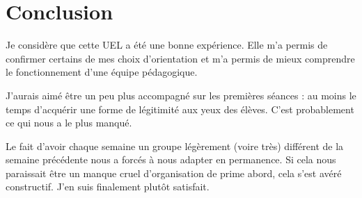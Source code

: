 \section{Conclusion}

Je considère que cette UEL a été une bonne expérience. Elle  m'a permis de confirmer certains de mes choix d'orientation
et m'a permis de mieux comprendre le fonctionnement d'une équipe pédagogique.

J'aurais aimé être un peu plus accompagné sur les premières séances : au moins le temps d'acquérir une forme de
légitimité aux yeux des élèves. C'est probablement ce qui nous a le plus manqué.

Le fait d'avoir chaque semaine un groupe légèrement (voire très) différent de la semaine précédente nous a forcés à nous
adapter en permanence. Si cela nous paraissait être un manque cruel d'organisation de prime abord, cela s'est avéré
constructif. J'en suis finalement plutôt satisfait.
